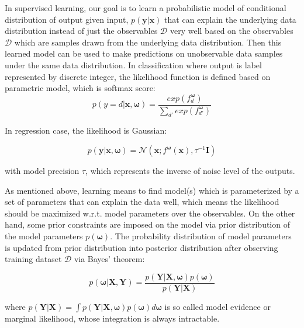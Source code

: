 In supervised learning, our goal is to learn a probabilistic model of conditional distribution of output given input, $p(\mathbf{y}|\mathbf{x})$ that can explain the underlying data distribution instead of just the observables $\mathcal{D}$ very well based on the observables $\mathcal{D}$ which are samples drawn from the underlying data distribution. Then this learned model can be used to make predictions on unobservable data samples under the same data distribution. In classification where output is label represented by discrete integer, the likelihood function is defined based on parametric model, which is softmax score:
\begin{equation}
p(y = d|\mathbf{x}, \boldsymbol{\omega}) = \frac{exp(f^{\boldsymbol{\omega}}_{d})}{\sum_{d'}exp(f^{\boldsymbol{\omega}}_{d'})}  \label{2.1}
\end{equation}

In regression case, the likelihood is Gaussian:

\begin{equation}
p(\mathbf{y}|\mathbf{x}, \boldsymbol{\omega}) = \mathcal{N}(\mathbf{x}; f^{\boldsymbol{\omega}}(\mathbf{x}), \tau^{-1}\textbf{I}) 
\label{2.2}
\end{equation}

with model precision $\tau$, which represents the inverse of noise level of the outputs.

As mentioned above, learning means to find model(s) which is parameterized by a set of parameters that can explain the data well, which means the likelihood should be maximized w.r.t. model parameters over the observables. On the other hand, some prior constraints are imposed on the model via prior distribution of the model parameters $p(\boldsymbol{\omega})$. The probability distribution of model parameters is updated from prior distribution into posterior distribution after observing training dataset $\mathcal{D}$ via Bayes' theorem:

\begin{equation}
p(\boldsymbol{\omega}|\mathbf{X}, \mathbf{Y}) = \frac{p(\mathbf{Y}|\mathbf{X}, \boldsymbol{\omega})p(\boldsymbol{\omega})}{p(\mathbf{Y}|\mathbf{X})}
\label{2.3}
\end{equation}

where $p(\mathbf{Y}| \mathbf{X}) = \int p(\mathbf{Y}| \mathbf{X}, \boldsymbol{\omega})p(\boldsymbol{\omega})d\boldsymbol{\omega}$ is so called model evidence or marginal likelihood, whose integration is always intractable.

